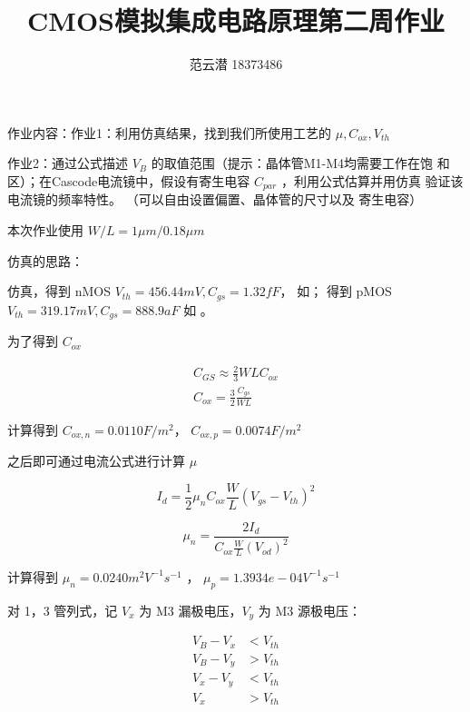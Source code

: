 \documentclass[lang=cn,11pt,a4paper,cite=authoryear]{elegantpaper}
\title{CMOS模拟集成电路原理\quad 第二周作业}
\author{范云潜 18373486}
\institute{微电子学院 184111 班}
\date{\zhtoday}
\begin{document}
\maketitle

作业内容：作业1：利用仿真结果，找到我们所使用工艺的 \(\mu, C_{ox}, V_{th}\)

作业2：通过公式描述 \(V_B\) 的取值范围（提示：晶体管M1-M4均需要工作在饱
和区）；在Cascode电流镜中，假设有寄生电容 \(C_{par}\) ，利用公式估算并用仿真
验证该电流镜的频率特性。 （可以自由设置偏置、晶体管的尺寸以及
寄生电容）



本次作业使用 \(W/L = 1\mu m / 0.18 \mu m\)


仿真的思路：

仿真，得到 nMOS \(V_{th} = 456.44 mV, C_{gs} = 1.32 fF \)， 如； 得到 pMOS \(V_{th} = 319.17 mV, C_{gs} = 888.9 aF\) 如 。




为了得到 \(C_{ox}\) 

\[\begin{aligned}
    C_{GS} \approx \frac{2}{3} WL C_{ox} \\ 
    C_{ox} = \frac{3}{2} \frac{C_{gs}}{WL} 
\end{aligned}\]

计算得到 \(C_{ox,n} = 0.0110 F/m^2\)， \(C_{ox,p} = 0.0074 F/m^2\)

之后即可通过电流公式进行计算 \(\mu\)

\[I_d = \frac{1}{2} \mu_n C_{ox} \frac{W}{L} (V_{gs} - V_{th})^2\]

\[\mu_n = \frac{2 I_d}{C_{ox} \frac{W}{L}(V_{od})^2}\]

计算得到 \(\mu_n = 0.0240 m^2 V^{-1}s^{-1}\) ， \(\mu_p = 1.3934e-04V^{-1}s^{-1} \)



对 1，3 管列式，记 \(V_x\) 为 M3 漏极电压，\(V_y\) 为 M3 源极电压：

\[\begin{aligned}
    V_B - V_x &< V_{th} \\
    V_B - V_y &> V_{th} \\ 
    V_x - V_y &< V_{th} \\ 
    V_x &> V_{th}
\end{aligned}\]
\end{document}

